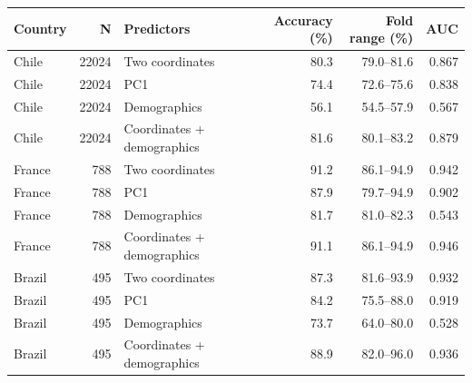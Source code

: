 \begin{tabular}{lrlrrr}
\toprule
Country & N & Predictors & Accuracy (\%) & Fold range (\%) & AUC \\
\midrule
Chile & 22024 & Two coordinates & 80.3 & 79.0--81.6 & 0.867 \\
Chile & 22024 & PC1 & 74.4 & 72.6--75.6 & 0.838 \\
Chile & 22024 & Demographics & 56.1 & 54.5--57.9 & 0.567 \\
Chile & 22024 & Coordinates + demographics & 81.6 & 80.1--83.2 & 0.879 \\
France & 788 & Two coordinates & 91.2 & 86.1--94.9 & 0.942 \\
France & 788 & PC1 & 87.9 & 79.7--94.9 & 0.902 \\
France & 788 & Demographics & 81.7 & 81.0--82.3 & 0.543 \\
France & 788 & Coordinates + demographics & 91.1 & 86.1--94.9 & 0.946 \\
Brazil & 495 & Two coordinates & 87.3 & 81.6--93.9 & 0.932 \\
Brazil & 495 & PC1 & 84.2 & 75.5--88.0 & 0.919 \\
Brazil & 495 & Demographics & 73.7 & 64.0--80.0 & 0.528 \\
Brazil & 495 & Coordinates + demographics & 88.9 & 82.0--96.0 & 0.936 \\
\bottomrule
\end{tabular}
